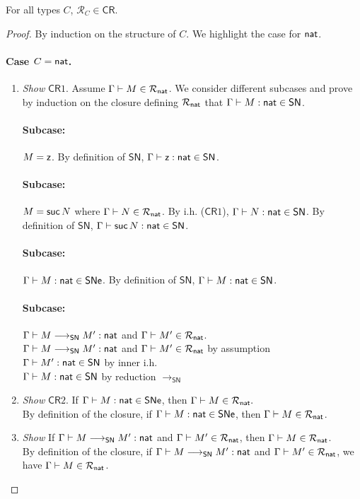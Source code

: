 \documentclass{article}
\newcommand{\SN}{\mathsf{SN}}
\newcommand{\SNe}{\mathsf{SNe}}
\newcommand{\CR}{\textsf{CR}}
\newcommand{\denot}[1]{\mathcal{R}_{#1}}
\newcommand{\inden}[3]{#1 \vdash #2 \in \denot{#3}}
\newcommand{\redSN}{\longrightarrow_\SN}
\begin{document}
\begin{theorem}
For all types $C$, $\denot{C}  \in \CR$.
\end{theorem}
\begin{proof}
By induction on the structure of $C$. We highlight the case for $\mathsf{nat}$.

\paragraph{Case $C = \mathsf{nat}$.}

\begin{enumerate}
\item \textit{Show} $\CR1$. Assume $\inden{\Gamma}{M}{\nat}$. We consider different subcases
  and prove by induction on the closure defining $\denot{\nat}$ that $\Gamma \vdash M : \nat \in \SN$.
%

\paragraph{Subcase:} $M = \mathsf{z}$. By definition of $\SN$, $\Gamma \vdash \zero : \nat \in \SN$.

\paragraph{Subcase:} $M = {\mathsf{suc}}\, N$ where $\inden{\Gamma}{N}{\nat}$.  By i.h. ($\CR1$),
$\Gamma \vdash N : \nat \in \SN$. By definition of $\SN$, $\Gamma \vdash \suc N : \nat \in \SN$.

 \paragraph{Subcase:} $\Gamma \vdash M  : \nat \in \SNe$. By definition of $\SN$, $\Gamma \vdash M : \nat \in \SN$.

 \paragraph{Subcase:} $\Gamma \vdash M \redSN M' : \nat$ and $\inden{\Gamma}{M'}{\nat}$.
 \\
 $\Gamma \vdash M \redSN M' : \nat$ and $\inden{\Gamma}{M'}{\nat}$ \hfill by assumption \\
 $\Gamma \vdash M' : \nat \in \SN$ \hfill by inner i.h. \\
 $\Gamma \vdash M  : \nat \in \SN$ \hfill by reduction $\redSN$


 \item \textit{Show} $\CR2$. If $\Gamma \vdash M : \nat \in \SNe$, then $\inden{\Gamma}{M}{\nat}.$ \\
	 By definition of the closure, if $\Gamma \vdash M : \nat \in \SNe$, then $\inden{\Gamma}{M}{\nat}$.

 \item \textit{Show} If $\Gamma \vdash M \redSN M' : \nat$ and $\inden{\Gamma}{M'}{\nat}$, then $\inden{\Gamma}{M}{\nat}$. \\
   By definition of the closure, if $\Gamma \vdash M \redSN M' : \nat$ and $\inden{\Gamma}{M'}{\nat}$, we have $\inden{\Gamma}{M}{\nat}$.
 \end{enumerate}
\end{proof}
\end{document}
